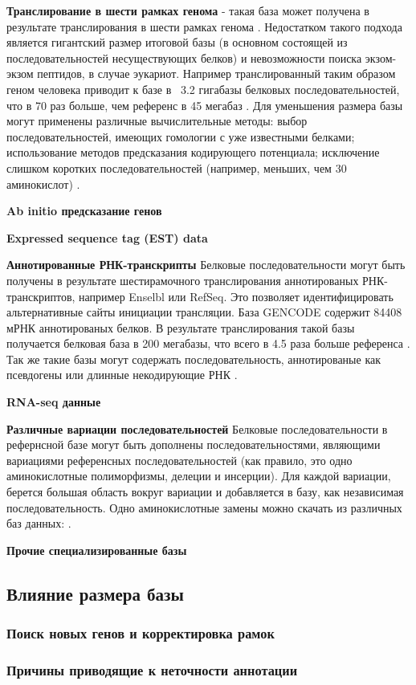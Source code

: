 \textbf{Транслирование в шести рамках генома} - такая база может получена в результате транслирования в шести рамках генома \cite{baerenfaller2008genome}. Недостатком такого подхода является гигантский размер итоговой базы (в основном состоящей из последовательностей несуществующих белков) и невозможности поиска экзом-экзом пептидов, в случае эукариот. Например транслированный таким образом геном человека приводит к базе в ~3.2 гигабазы белковых последовательностей, что в 70 раз больше, чем референс в 45 мегабаз \cite{khatun2013whole}. Для уменьшения размера базы могут применены различные вычислительные методы: выбор последовательностей, имеющих гомологии с уже известными белками; использование методов предсказания кодирующего потенциала; исключение слишком коротких последовательностей (например, меньших, чем 30 аминокислот) \cite{blakeley2012addressing}. 

\textbf{Ab initio предсказание генов} 

\textbf{Expressed sequence tag (EST) data}

\textbf{Аннотированные РНК-транскрипты} Белковые последовательности могут быть получены в результате шестирамочного транслирования аннотированых РНК-транскриптов, например Enselbl или RefSeq. Это позволяет идентифицировать альтернативные сайты инициации трансляции. База GENCODE содержит 84408 мРНК аннотированых белков. В результате транслирования такой базы получается белковая база в 200 мегабазы, что всего в 4.5 раза больше референса \cite{khatun2013whole}. Так же такие базы могут содержать последовательность, аннотированые как псевдогены или длинные некодирующие РНК \cite{derrien2012gencode}.

\textbf{RNA-seq данные}

\textbf{Различные вариации последовательностей} Белковые последовательности в рефернсной базе могут быть дополнены последовательностями, являющими вариациями референсных последовательностей (как правило, это одно аминокислотные полиморфизмы, делеции и инсерции). Для каждой вариации, берется большая область вокруг вариации и добавляется в базу, как независимая последовательность. Одно аминокислотные замены можно скачать из различных баз данных:  \cite{li2011bioinformatics}.  

\textbf{Прочие специализированные базы}

\subsection{Влияние размера базы}


\subsubsection{Поиск новых генов и корректировка рамок}
\subsubsection{Причины приводящие к неточности аннотации}

\newpage
